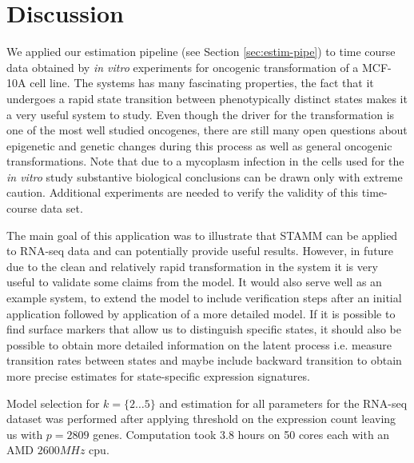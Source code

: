\section{Discussion}
\label{sec:discussion-onco}

We applied our estimation pipeline (see Section \ref{sec:estim-pipe}) to time course data obtained by {\it in vitro} experiments for oncogenic transformation of a MCF-10A cell line. The systems has many fascinating properties, the fact that it undergoes a rapid state transition between phenotypically distinct states makes it a very useful system to study. Even though the driver for the transformation is one of the most well studied oncogenes, there are still many open questions about epigenetic and genetic changes  during this process as well as general oncogenic transformations. Note that due to a mycoplasm infection in  the cells used for the {\it in vitro} study substantive  biological conclusions can be drawn only with extreme caution. Additional experiments are needed to verify the validity of this time-course data set.

The main goal of this application was to illustrate that STAMM can be applied to RNA-seq data and can potentially provide useful results. However, in future due to the clean and relatively rapid transformation in the system it is very useful to validate some claims from the model. It would also serve well as an example system, to extend the model to include verification steps after an initial application followed by application of a more detailed model. If it is possible to find surface markers that allow us to distinguish specific states, it should also be possible to obtain more detailed information on the latent process i.e. measure transition rates between states and maybe include backward transition to obtain more precise estimates for state-specific expression signatures.


Model selection for $k = \lbrace 2 \ldots 5 \rbrace$ and estimation for all parameters for the RNA-seq dataset was performed after applying threshold on the expression count leaving us with $p=2809$ genes. Computation took $3.8$ hours on 50 cores each with an AMD $2600MHz$ cpu.



